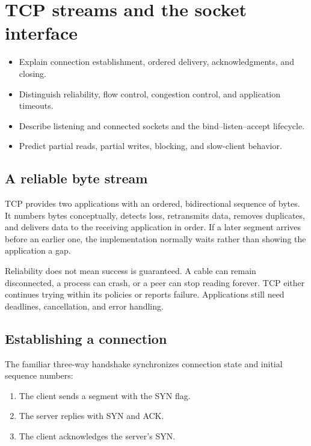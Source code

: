 \chapter{TCP streams and the socket interface}

\begin{objectives}
\begin{itemize}
  \item Explain connection establishment, ordered delivery, acknowledgments, and closing.
  \item Distinguish reliability, flow control, congestion control, and application timeouts.
  \item Describe listening and connected sockets and the bind--listen--accept lifecycle.
  \item Predict partial reads, partial writes, blocking, and slow-client behavior.
\end{itemize}
\end{objectives}

\section{A reliable byte stream}

TCP provides two applications with an ordered, bidirectional sequence of bytes.
It numbers bytes conceptually, detects loss, retransmits data, removes duplicates,
and delivers data to the receiving application in order. If a later segment
arrives before an earlier one, the implementation normally waits rather than
showing the application a gap.

Reliability does not mean success is guaranteed. A cable can remain disconnected,
a process can crash, or a peer can stop reading forever. TCP either continues
trying within its policies or reports failure. Applications still need deadlines,
cancellation, and error handling.

\section{Establishing a connection}

The familiar three-way handshake synchronizes connection state and initial
sequence numbers:

\begin{enumerate}
  \item The client sends a segment with the SYN flag.
  \item The server replies with SYN and ACK.
  \item The client acknowledges the server's SYN.
\end{enumerate}

